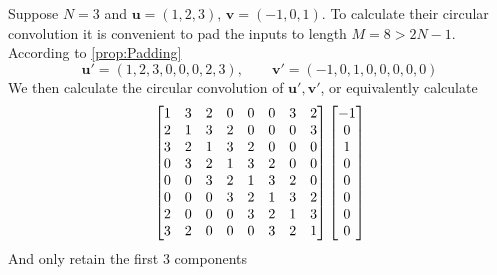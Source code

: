 \begin{example}
    Suppose \(N = 3\) and \(\bm{u} = (1,2,3),\, \bm{v} = (-1, 0, 1)\). To calculate their circular convolution it is convenient to pad the inputs to length \(M = 8 > 2N - 1\). According to \cref{prop:Padding}
    \[\bm{u}' = (1,2,3,0,0,0,2,3), \qquad \bm{v}'=(-1, 0, 1, 0, 0, 0, 0, 0)\]
    We then calculate the circular convolution of \(\bm{u}', \bm{v}'\), or equivalently calculate
    \[\setlength{\arraycolsep}{5pt}\begin{bmatrix}
        1 & 3 & 2 & 0 & 0 & 0 & 3 & 2 \\
        2 & 1 & 3 & 2 & 0 & 0 & 0 & 3 \\
        3 & 2 & 1 & 3 & 2 & 0 & 0 & 0 \\
        0 & 3 & 2 & 1 & 3 & 2 & 0 & 0 \\
        0 & 0 & 3 & 2 & 1 & 3 & 2 & 0 \\
        0 & 0 & 0 & 3 & 2 & 1 & 3 & 2 \\
        2 & 0 & 0 & 0 & 3 & 2 & 1 & 3 \\
        3 & 2 & 0 & 0 & 0 & 3 & 2 & 1
    \end{bmatrix} \begin{bmatrix}
        -1 \\ 0 \\ 1 \\ 0 \\ 0 \\ 0 \\ 0 \\ 0
    \end{bmatrix}\]
    And only retain the first 3 components
\end{example}
\fi